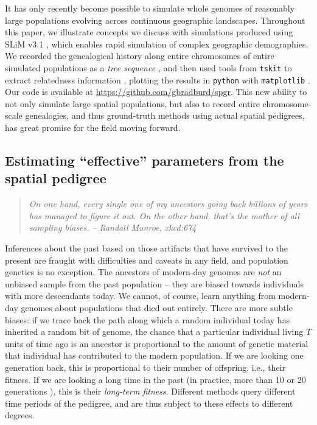\documentclass{ar-1col}
\newcommand{\todo}[1]{{\textbf{\color{red}{#1}}}}
\renewcommand{\emph}[1]{{\textit{#1}}}
\begin{document}
It has only recently become possible to simulate whole genomes
of reasonably large populations
evolving across continuous geographic landscapes.
Throughout this paper, 
we illustrate concepts we discuss with simulations 
produced using SLiM v3.1 \citep{haller2018forward},
which enables rapid simulation of complex geographic demographies.
We recorded the genealogical history along entire chromosomes
of entire simulated populations
as a \emph{tree sequence} \citep{kelleher2018efficient},
and then used tools from \texttt{tskit} to extract relatedness information \todo{ref for tskit? is it just msprime?},
plotting the results in \texttt{python} with \texttt{matplotlib} \citep{hunter2007matplotlib}.
Our code is available at \url{https://github.com/gbradburd/spgr}.
This new ability to not only simulate large spatial populations,
but also to record entire chromosome-scale genealogies,
and thus ground-truth methods using actual spatial pedigrees,
has great promise for the field moving forward.


\subsection{Estimating ``effective'' parameters from the spatial pedigree}

\begin{quote}
    \textit{
    On one hand, every single one of my ancestors going back billions of years
    has managed to figure it out.
    On the other hand, that's the mother of all sampling biases.}
    \hfill \textit{-- Randall Munroe, xkcd:674}
\end{quote}

Inferences about the past
based on those artifacts that have survived to the present
are fraught with difficulties and caveats in any field, 
and population genetics is no exception.
The ancestors of modern-day genomes are \emph{not} an unbiased sample
from the past population -- 
they are biased towards individuals with more descendants today.
We cannot, of course, learn anything from modern-day genomes
about populations that died out entirely.
There are more subtle biases:
if we trace back the path along which a random individual today 
has inherited a random bit of genome,
the chance that a particular individual living $T$ units of time ago is an ancestor
is proportional to the amount of genetic material that individual has contributed to the modern population.
If we are looking one generation back, 
this is proportional to their number of offspring, i.e., their fitness.
If we are looking a long time in the past
(in practice, more than 10 or 20 generations \citep{BartonEtheridge2011fitness}),
this is their \emph{long-term fitness}.
Different methods query different time periods of the pedigree,
and are thus subject to these effects to different degrees.
\end{document}
